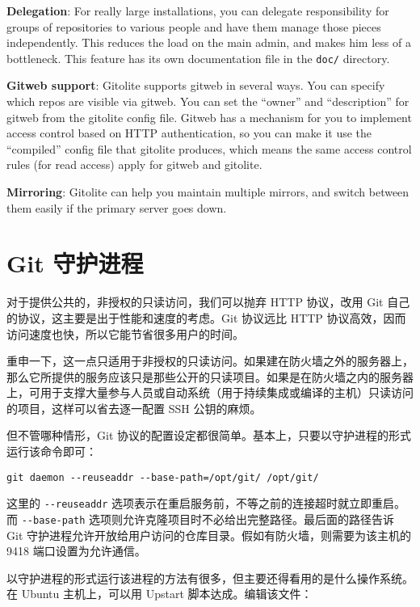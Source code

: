 \documentclass[a4paper]{book}
\begin{document}
\textbf{Delegation}: For really large installations, you can delegate responsibility for groups of repositories to various people and have them manage those pieces independently. This reduces the load on the main admin, and makes him less of a bottleneck. This feature has its own documentation file in the \texttt{doc/} directory.

\textbf{Gitweb support}: Gitolite supports gitweb in several ways. You can specify which repos are visible via gitweb. You can set the “owner” and “description” for gitweb from the gitolite config file. Gitweb has a mechanism for you to implement access control based on HTTP authentication, so you can make it use the “compiled” config file that gitolite produces, which means the same access control rules (for read access) apply for gitweb and gitolite.

\textbf{Mirroring}: Gitolite can help you maintain multiple mirrors, and switch between them easily if the primary server goes down.

\section{Git 守护进程}

对于提供公共的，非授权的只读访问，我们可以抛弃 HTTP 协议，改用 Git 自己的协议，这主要是出于性能和速度的考虑。Git 协议远比 HTTP 协议高效，因而访问速度也快，所以它能节省很多用户的时间。

重申一下，这一点只适用于非授权的只读访问。如果建在防火墙之外的服务器上，那么它所提供的服务应该只是那些公开的只读项目。如果是在防火墙之内的服务器上，可用于支撑大量参与人员或自动系统（用于持续集成或编译的主机）只读访问的项目，这样可以省去逐一配置 SSH 公钥的麻烦。

但不管哪种情形，Git 协议的配置设定都很简单。基本上，只要以守护进程的形式运行该命令即可：

\begin{shaded}\begin{verbatim}
git daemon --reuseaddr --base-path=/opt/git/ /opt/git/
\end{verbatim}\end{shaded}

这里的 \texttt{-{}-reuseaddr} 选项表示在重启服务前，不等之前的连接超时就立即重启。而 \texttt{-{}-base-path} 选项则允许克隆项目时不必给出完整路径。最后面的路径告诉 Git 守护进程允许开放给用户访问的仓库目录。假如有防火墙，则需要为该主机的 9418 端口设置为允许通信。

以守护进程的形式运行该进程的方法有很多，但主要还得看用的是什么操作系统。在 Ubuntu 主机上，可以用 Upstart 脚本达成。编辑该文件：
\end{document}
